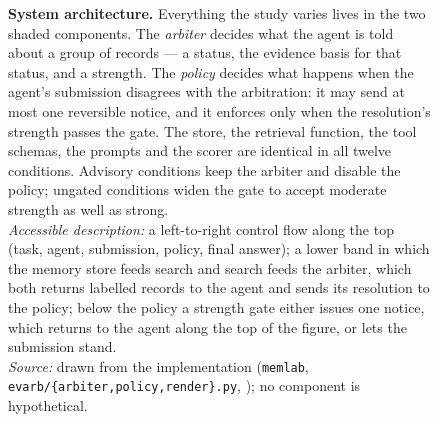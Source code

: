 \begin{figure}[t]
\vspace{1mm}
\caption[AGENTRUN / Evarb system architecture]{%
\textbf{System architecture.} Everything the study varies lives in the two shaded components. The
\emph{arbiter} decides what the agent is told about a group of records --- a status, the evidence basis for that
status, and a strength. The \emph{policy} decides what happens when the agent's submission disagrees with the
arbitration: it may send at most one reversible notice, and it enforces only when the resolution's strength passes
the gate. The store, the retrieval function, the tool schemas, the prompts and the scorer are identical in all
twelve conditions. Advisory conditions keep the arbiter and disable the policy; ungated conditions widen the gate
to accept moderate strength as well as strong.\\
\emph{Accessible description:} a left-to-right control flow along the top (task, agent, submission, policy, final
answer); a lower band in which the memory store feeds search and search feeds the arbiter, which both returns
labelled records to the agent and sends its resolution to the policy; below the policy a strength gate either
issues one notice, which returns to the agent along the top of the figure, or lets the submission stand.\\
\emph{Source:} drawn from the implementation (\texttt{memlab}, \texttt{evarb/\{arbiter,policy,render\}.py},
); no component is hypothetical.}
\label{fig:architecture}
\end{figure}
